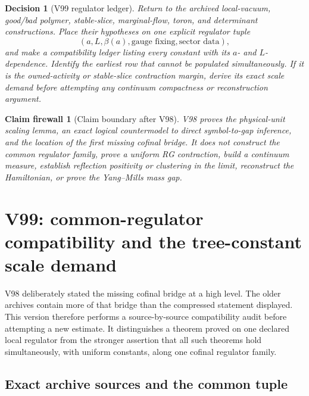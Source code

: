 \documentclass[11pt,oneside]{article}
\newtheorem{firewall}[theorem]{Claim firewall}
\newtheorem{decision}[theorem]{Decision}
\theoremstyle{definition}
\theoremstyle{remark}
\begin{document}
\begin{decision}[V99 regulator ledger]
\label{dec:newv98-next}
Return to the archived local-vacuum, good/bad polymer, stable-slice,
marginal-flow, toron, and determinant constructions.  Place their
hypotheses on one explicit regulator tuple
\[
 (a,L,\beta(a),\text{gauge fixing},\text{sector data}),          \tag{98.15}
\]
and make a compatibility ledger listing every constant with its
\(a\)- and \(L\)-dependence.  Identify the earliest row that cannot
be populated simultaneously.  If it is the owned-activity or
stable-slice contraction margin, derive its exact scale demand
before attempting any continuum compactness or reconstruction
argument.
\end{decision}

\begin{firewall}[Claim boundary after V98]
\label{fire:newv98-final}
V98 proves the physical-unit scaling lemma, an exact logical
countermodel to direct symbol-to-gap inference, and the location of
the first missing cofinal bridge.  It does not construct the common
regulator family, prove a uniform RG contraction, build a continuum
measure, establish reflection positivity or clustering in the
limit, reconstruct the Hamiltonian, or prove the Yang--Mills mass
gap.
\end{firewall}

\section*{V99: common-regulator compatibility and the tree-constant scale demand}
\label{sec:newv99-compatibility}

V98 deliberately stated the missing cofinal bridge at a high level.
The older archives contain more of that bridge than the compressed
statement displayed.  This version therefore performs a
source-by-source compatibility audit before attempting a new
estimate.  It distinguishes a theorem proved on one declared local
regulator from the stronger assertion that all such theorems hold
simultaneously, with uniform constants, along one cofinal regulator
family.

\subsection{Exact archive sources and the common tuple}
\end{document}
